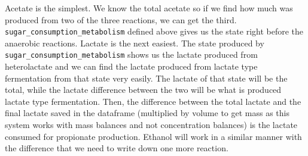 \documentclass[11pt]{article}
\begin{document}
Acetate is the simplest. We know the total acetate so if we find how much was produced from two of the three reactions, we can get the third. \texttt{sugar\_consumption\_metabolism} defined above gives us the state right before the anaerobic reactions. Lactate is the next easiest. The state produced by \texttt{sugar\_consumption\_metabolism} shows us the lactate produced from heterolactate and we can find the lactate produced from lactate type fermentation from that state very easily. The lactate of that state will be the total, while the lactate difference between the two will be what is produced lactate type fermentation. Then, the difference between the total lactate and the final lactate saved in the dataframe (multiplied by volume to get mass as this system works with mass balances and not concentration balances) is the lactate consumed for propionate production. Ethanol will work in a similar manner with the difference that we need to write down one more reaction.
\end{document}
